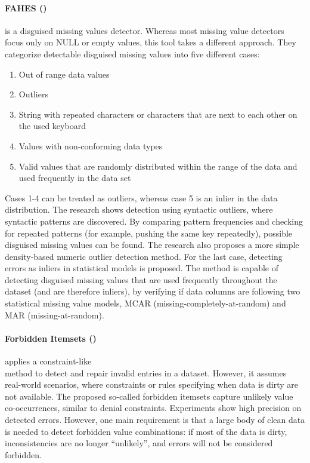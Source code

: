 \paragraph{FAHES (\cite{Qahtan2018-te})} is a disguised missing values detector. Whereas most missing value detectors focus only on NULL or empty values, this tool takes a different approach. They categorize detectable disguised missing values into five different cases: 
\begin{enumerate}
    \item Out of range data values
    \item Outliers
    \item String with repeated characters or characters that are next to each other on the used keyboard
    \item Values with non-conforming data types
    \item Valid values that are randomly distributed within the range of the data and used frequently in the data set
\end{enumerate}

Cases 1-4 can be treated as outliers, whereas case 5 is an inlier in the data distribution. 
The research shows detection using syntactic outliers, where syntactic patterns are discovered. By comparing pattern frequencies and checking for repeated patterns (for example, pushing the same key repeatedly), possible disguised missing values can be found. The research also proposes a more simple density-based numeric outlier detection method. 
For the last case, detecting errors as inliers in statistical models is proposed. The method is capable of detecting disguised missing values that are used frequently throughout the dataset (and are therefore inliers), by verifying if data columns are following two statistical missing value models, MCAR (missing-completely-at-random) and MAR (missing-at-random). 

\paragraph{Forbidden Itemsets (\cite{Rammelaere2019-ea})} applies a constraint-like \\method to detect and repair invalid entries in a dataset. However, it assumes real-world scenarios, where constraints or rules specifying when data is dirty are not available. The proposed so-called forbidden itemsets capture unlikely value co-occurrences, similar to denial constraints. Experiments show high precision on detected errors. However, one main requirement is that a large body of clean data is needed to detect forbidden value combinations: if most of the data is dirty, inconsistencies are no longer “unlikely”, and errors will not be considered forbidden. 

